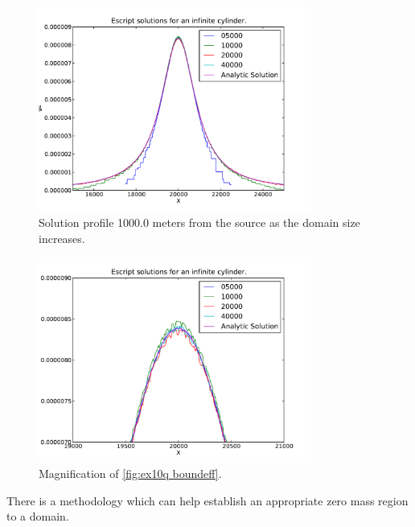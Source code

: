 \begin{figure}[ht]
\centering
\includegraphics[width=0.8\textwidth]{figures/ex10q_boundeff.pdf}
\caption{Solution profile 1000.0 meters from the source as the domain size
increases.}
\label{fig:ex10q boundeff}
\end{figure}

\begin{figure}[ht]
\centering
\includegraphics[width=0.8\textwidth]{figures/ex10q_boundeff_zoom.pdf}
\caption{Magnification of \autoref{fig:ex10q boundeff}.}
\label{fig:ex10q boundeff zoom}
\end{figure}

There is a methodology which can help establish an appropriate zero mass region
to a domain. 
\clearpage
